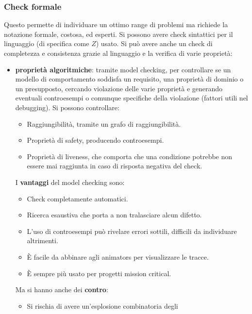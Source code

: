 \subsubsection{Check formale}
Questo permette di individuare un ottimo range di problemi ma richiede la notazione
formale, costosa, ed esperti. Si possono avere check sintattici per il linguaggio
(di specifica come $Z$) usato. Si può avere anche un check di completezza e
consistenza grazie al linguaggio e la verifica di varie proprietà:
\begin{itemize}
      \item \textbf{proprietà algoritmiche}: tramite model checking, per controllare se un modello di
            comportamento soddisfa un requisito, una proprietà di dominio o un
            presupposto, cercando violazione delle varie proprietà e generando
            eventuali controesempi o comunque specifiche della violazione
            (fattori utili nel debugging). Si possono controllare:
            \begin{itemize}
                  \item Raggiungibilità, tramite un grafo di raggiungibilità.
                  \item Proprietà di safety, producendo controesempi.
                  \item Proprietà di liveness, che comporta che una condizione
                        potrebbe non essere mai raggiunta in caso di risposta
                        negativa del check.
            \end{itemize}
            I \textbf{vantaggi} del model checking sono:
            \begin{itemize}
                  \item Check completamente automatici.
                  \item Ricerca esaustiva che porta a non tralasciare alcun
                        difetto.
                  \item L'uso di controesempi può rivelare errori sottili,
                        difficili da individuare altrimenti.
                  \item È facile da abbinare agli animators per visualizzare le
                        tracce.
                  \item È sempre più usato per progetti mission critical.
            \end{itemize}
            Ma si hanno anche dei \textbf{contro}:
            \begin{itemize}
                  \item Si rischia di avere un'esplosione combinatoria degli

\end{itemize}
\end{itemize}
